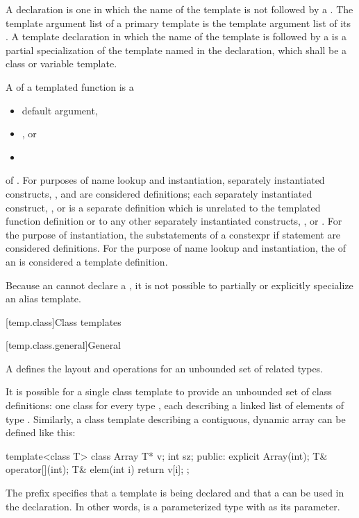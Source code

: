 \pnum
A  declaration is one
in which the name of the template is not followed by
a .
The template argument list of a primary template is
the template argument list of its .
A template declaration in which the name of the template is followed by
a  is
a partial specialization of
the template named in the declaration,
which shall be a class or variable template.

\pnum
A 
of a templated function  is a
\begin{itemize}
\item default argument,
\item {}, or
\item {}
\end{itemize}
of .
For purposes of name lookup and instantiation,
separately instantiated constructs,
, and
are considered definitions;
each
separately instantiated construct,
, or
is a separate definition
which is unrelated
to the templated function definition or
to any other
separately instantiated constructs,
, or
.
For the purpose of instantiation, the substatements of a constexpr if
statement are considered definitions.
For the purpose of name lookup and instantiation,
the  of an 
is considered a template definition.

\pnum
Because an  cannot declare a
, it is not possible to partially or
explicitly specialize an alias template.

[temp.class]{Class templates}

[temp.class.general]{General}

\pnum
A
defines the layout and operations
for an unbounded set of related types.

\pnum
\begin{example}
It is possible for a single class template
to provide an unbounded set of class definitions:
one class  for every type ,
each describing a linked list of elements of type .
Similarly, a class template  describing a contiguous,
dynamic array can be defined like this:
\begin{codeblock}
template<class T> class Array {
  T* v;
  int sz;
public:
  explicit Array(int);
  T& operator[](int);
  T& elem(int i) { return v[i]; }
};
\end{codeblock}
The prefix 
specifies that a template is being declared and that a
 
can be used in the declaration.
In other words,
is a parameterized type with
as its parameter.
\end{example}

